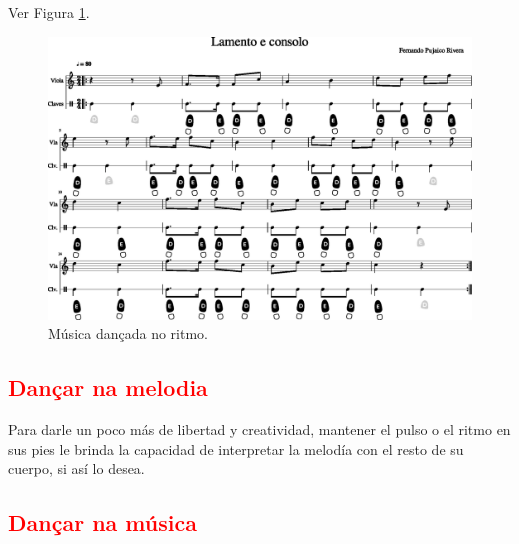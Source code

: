 Ver Figura \ref{fig:lamentoconsoloritmo1}.
\begin{figure}
    \centering
    \includegraphics[width=\textwidth]{chapters/cap-musicalidade-tecnica/lamento-e-consolo-clave-ritmo-1.eps}
    \caption{Música dançada no ritmo.}
    \label{fig:lamentoconsoloritmo1}
\end{figure}

\subsection{\textcolor{red}{Dançar na melodia}}
Para darle un poco más de libertad y creatividad, 
mantener el pulso o el ritmo en sus pies le brinda la capacidad de interpretar 
la melodía con el resto de su cuerpo, si así lo desea.

\subsection{\textcolor{red}{Dançar na música}}

